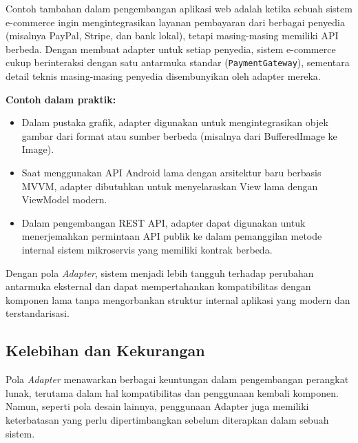 Contoh tambahan dalam pengembangan aplikasi web adalah ketika sebuah sistem e-commerce ingin mengintegrasikan layanan pembayaran dari berbagai penyedia (misalnya PayPal, Stripe, dan bank lokal), tetapi masing-masing memiliki API berbeda. Dengan membuat adapter untuk setiap penyedia, sistem e-commerce cukup berinteraksi dengan satu antarmuka standar (\texttt{PaymentGateway}), sementara detail teknis masing-masing penyedia disembunyikan oleh adapter mereka.

\textbf{Contoh dalam praktik:}
\begin{itemize}
	\item Dalam pustaka grafik, adapter digunakan untuk mengintegrasikan objek gambar dari format atau sumber berbeda (misalnya dari BufferedImage ke Image).
	\item Saat menggunakan API Android lama dengan arsitektur baru berbasis MVVM, adapter dibutuhkan untuk menyelaraskan View lama dengan ViewModel modern.
	\item Dalam pengembangan REST API, adapter dapat digunakan untuk menerjemahkan permintaan API publik ke dalam pemanggilan metode internal sistem mikroservis yang memiliki kontrak berbeda.
\end{itemize}

Dengan pola \textit{Adapter}, sistem menjadi lebih tangguh terhadap perubahan antarmuka eksternal dan dapat mempertahankan kompatibilitas dengan komponen lama tanpa mengorbankan struktur internal aplikasi yang modern dan terstandarisasi.

\subsection{Kelebihan dan Kekurangan}

Pola \textit{Adapter} menawarkan berbagai keuntungan dalam pengembangan perangkat lunak, terutama dalam hal kompatibilitas dan penggunaan kembali komponen. Namun, seperti pola desain lainnya, penggunaan Adapter juga memiliki keterbatasan yang perlu dipertimbangkan sebelum diterapkan dalam sebuah sistem.

